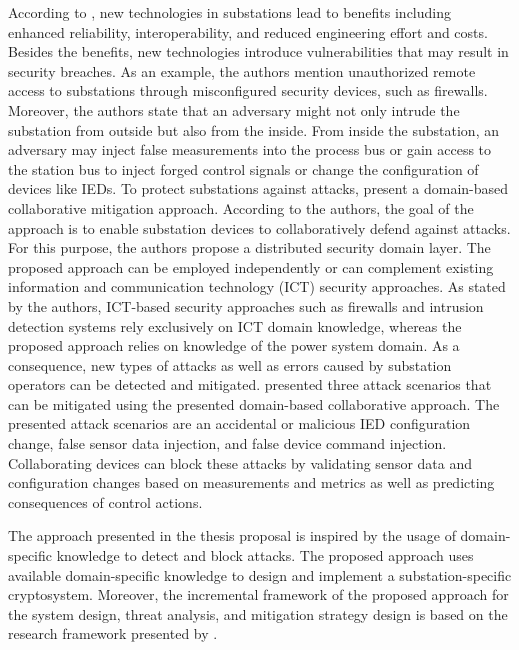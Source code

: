 According to \citeauthor{Hong2019} \cite{Hong2019}, new technologies in substations lead to benefits including enhanced reliability, interoperability, and reduced engineering effort and costs.
Besides the benefits, new technologies introduce vulnerabilities that may result in security breaches.
As an example, the authors mention unauthorized remote access to substations through misconfigured security devices, such as firewalls.
Moreover, the authors state that an adversary might not only intrude the substation from outside but also from the inside.
From inside the substation, an adversary may inject false measurements into the process bus or gain access to the station bus to inject forged control signals or change the configuration of devices like IEDs.
To protect substations against attacks, \citeauthor{Hong2019} present a domain-based collaborative mitigation approach.
According to the authors, the goal of the approach is to enable substation devices to collaboratively defend against attacks.
For this purpose, the authors propose a distributed security domain layer.
The proposed approach can be employed independently or can complement existing information and communication technology (ICT) security approaches.
As stated by the authors, ICT-based security approaches such as firewalls and intrusion detection systems rely exclusively on ICT domain knowledge, whereas the proposed approach relies on knowledge of the power system domain.
As a consequence, new types of attacks as well as errors caused by substation operators can be detected and mitigated.
\citeauthor{Hong2019} presented three attack scenarios that can be mitigated using the presented domain-based collaborative approach.
The presented attack scenarios are an accidental or malicious IED configuration change, false sensor data injection, and false device command injection.
Collaborating devices can block these attacks by validating sensor data and configuration changes based on measurements and metrics as well as predicting consequences of control actions.

The approach presented in the thesis proposal is inspired by the usage of domain-specific knowledge to detect and block attacks.
The proposed approach uses available domain-specific knowledge to design and implement a substation-specific cryptosystem.
Moreover, the incremental framework of the proposed approach for the system design, threat analysis, and mitigation strategy design is based on the research framework presented by \citeauthor{Hong2019}.

